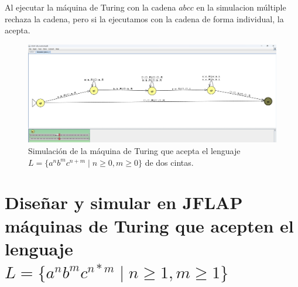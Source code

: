 \documentclass[11pt]{report}
\begin{document}
\begin{itemize}
        Al ejecutar la máquina de Turing con la cadena $abcc$ en la simulacion múltiple rechaza la cadena, pero si la ejecutamos con la cadena de forma individual, la acepta. 
        \begin{figure}[H]
          \centering
          \includegraphics[scale=0.3]{img/MT_02_multiple_ribbon_simulation_2.png}
          \caption{Simulación de la máquina de Turing que acepta el lenguaje $L = \{a^nb^mc^{n+m} \mid n \geq 0, m \geq 0\}$ de dos cintas.}
        \end{figure}
\end{itemize}

\newpage

\section{Diseñar y simular en JFLAP máquinas de Turing que acepten el lenguaje $L = \{a^nb^mc^{n*m} \mid n \geq 1, m \geq 1\}$}

\end{document}
